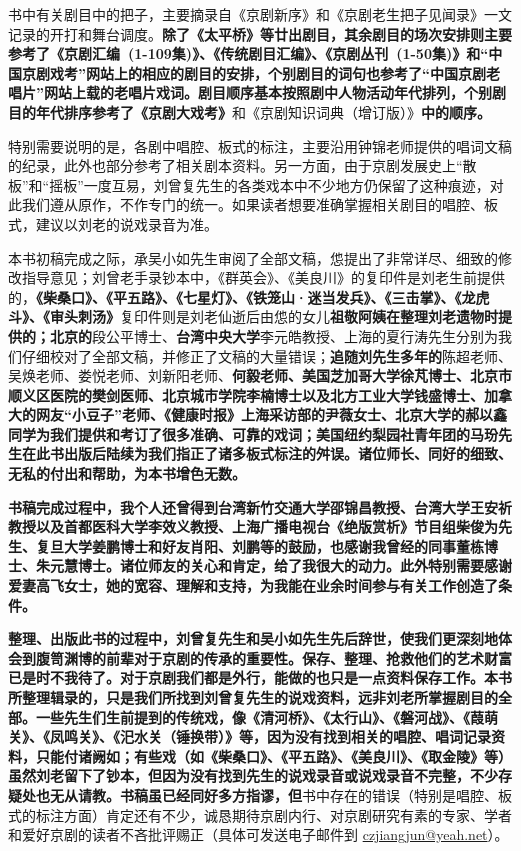 书中有关剧目中的把子，主要摘录自《京剧新序》和《京剧老生把子见闻录》一文记录的开打和舞台调度。\textbf{除了《太平桥》等廿出剧目，其余剧目的场次安排则主要参考了《京剧汇编~(1-109集)》、《传统剧目汇编》、《京剧丛刊~(1-50集)》和``中国京剧戏考''网站上的相应的剧目的安排，个别剧目的词句也参考了``中国京剧老唱片''网站上载的老唱片戏词。剧目顺序基本按照剧中人物活动年代排列，个别剧目的年代排序参考了《京剧大戏考》}和《京剧知识词典（增订版）》\textbf{中的顺序。}

特别需要说明的是，各剧中唱腔、板式的标注，主要沿用钟锦老师提供的唱词文稿的纪录，此外也部分参考了相关剧本资料。另一方面，由于京剧发展史上``散板''和``摇板''一度互易，刘曾复先生的各类戏本中不少地方仍保留了这种痕迹，对此我们遵从原作，不作专门的统一。如果读者想要准确掌握相关剧目的唱腔、板式，建议以刘老的说戏录音为准。

本书初稿完成之际，承吴小如先生审阅了全部文稿，怹提出了非常详尽、细致的修改指导意见；刘曾老手录钞本中，《群英会》、《美良川》的复印件是刘老生前提供的，\textbf{《柴桑口》、《平五路》、《七星灯》、《铁笼山·迷当发兵》、《三击掌》、《龙虎斗》、《审头刺汤》}复印件则是刘老仙逝后由怹的女儿\textbf{祖敬阿姨在整理刘老遗物时提供的；北京的}段公平博士、\textbf{台湾中央大学}李元皓教授、上海的夏行涛先生分别为我们仔细校对了全部文稿，并修正了文稿的大量错误；\textbf{追随刘先生多年的}陈超老师、吴焕老师、娄悦老师、刘新阳老师、\textbf{何毅老师、美国芝加哥大学徐芃博士、北京市顺义区医院的樊剑医师、北京城市学院李楠博士以及北方工业大学钱盛博士、加拿大的网友``小豆子''老师、《健康时报》上海采访部的尹薇女士、北京大学的郝以鑫同学为我们提供和考订了很多准确、可靠的戏词；美国纽约梨园社青年团的马玢先生在此书出版后陆续为我们指正了诸多板式标注的舛误。诸位师长、同好的细致、无私的付出和帮助，为本书增色无数。}

\textbf{书稿完成过程中，我个人还曾得到台湾新竹交通大学邵锦昌教授、台湾大学王安祈教授以及首都医科大学李效义教授、上海广播电视台《绝版赏析》节目组柴俊为先生、复旦大学姜鹏博士和好友肖阳、刘鹏等的鼓励，也感谢我曾经的同事董栋博士、朱元慧博士。诸位师友的关心和肯定，给了我很大的动力。此外特别需要感谢爱妻高飞女士，她的宽容、理解和支持，为我能在业余时间参与有关工作创造了条件。}

\textbf{整理、出版此书的过程中，刘曾复先生和吴小如先生先后辞世，使我们更深刻地体会到腹笥渊博的前辈对于京剧的传承的重要性。保存、整理、抢救他们的艺术财富已是时不我待了。对于京剧我们都是外行，能做的也只是一点资料保存工作。本书所整理辑录的，只是我们所找到刘曾复先生的说戏资料，远非刘老所掌握剧目的全部。一些先生们生前提到的传统戏，像《清河桥》、《太行山》、《磐河战》、《葭萌关》、《凤鸣关》、《汜水关（锤换带）》等，因为没有找到相关的唱腔、唱词记录资料，只能付诸阙如；有些戏（如《柴桑口》、《平五路》、《美良川》、《取金陵》等）虽然刘老留下了钞本，但因为没有找到先生的说戏录音或说戏录音不完整，不少存疑处也无从请教。书稿虽已经同好多方指谬，但}书中存在的错误（特别是唱腔、板式的标注方面）肯定还有不少，诚恳期待京剧内行、对京剧研究有素的专家、学者和爱好京剧的读者不吝批评赐正（具体可发送电子邮件到
\href{mailto:czjiangjun@yeah.net}{{czjiangjun@yeah.net}}）。

